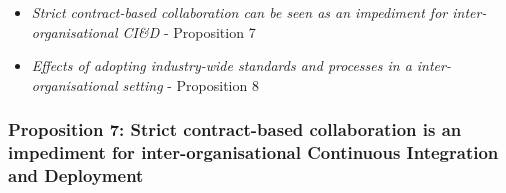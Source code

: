 \begin{itemize}
\item {\em Strict contract-based collaboration can be seen as an impediment for inter-organisational CI\&D}  - Proposition 7 
\item {\em Effects of adopting industry-wide standards and processes in a inter-organisational setting} - Proposition 8 
\end{itemize}

\vspace{.2cm}
\subsubsection{Proposition 7: Strict contract-based collaboration is an impediment for inter-organisational Continuous Integration and Deployment}

